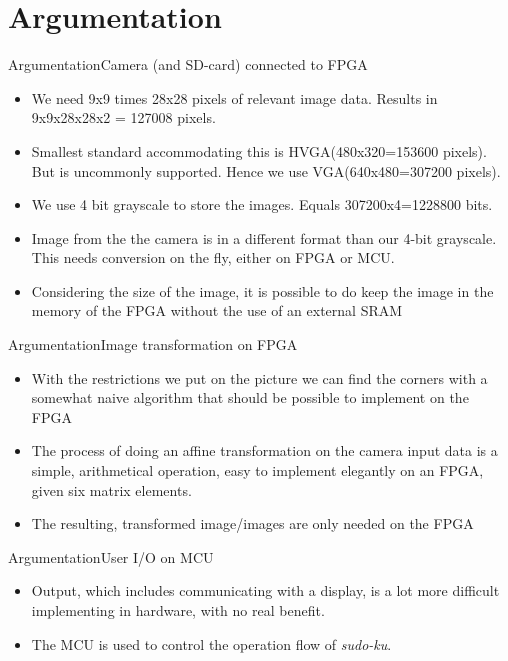 \documentclass[10pt]{beamer}
\begin{document}
\section{Argumentation}
\begin{frame}{Argumentation}{Camera (and SD-card) connected to FPGA}
\begin{itemize}
\item We need 9x9 times 28x28 pixels of relevant image data. Results in 9x9x28x28x2 = 127008 pixels.
\item Smallest standard accommodating this is HVGA(480x320=153600 pixels). But is uncommonly supported. Hence we use VGA(640x480=307200 pixels).
\item We use 4 bit grayscale to store the images. Equals 307200x4=1228800 bits.
\item Image from the the camera is in a different format than our 4-bit grayscale. This needs conversion on the fly, either on FPGA or MCU.
\item Considering the size of the image, it is possible to do keep the image in the memory of the FPGA without the use of an external SRAM
\end{itemize}
\end{frame}

\begin{frame}{Argumentation}{Image transformation on FPGA}
\begin{itemize}
\item With the restrictions we put on the picture we can find the corners with a somewhat naive algorithm that should be possible to implement on the FPGA
\item The process of doing an affine transformation on the camera input data is a simple, arithmetical operation, easy to implement elegantly on an FPGA, given six matrix elements.
\item The resulting, transformed image/images are only needed on the FPGA
\end{itemize}
\end{frame}

\begin{frame}{Argumentation}{User I/O on MCU}
\begin{itemize}
\item Output, which includes communicating with a display, is a lot more difficult implementing in hardware, with no real benefit.
\item The MCU is used to control the operation flow of \textit{sudo-ku}.
\end{itemize}
\end{frame}
\end{document}
